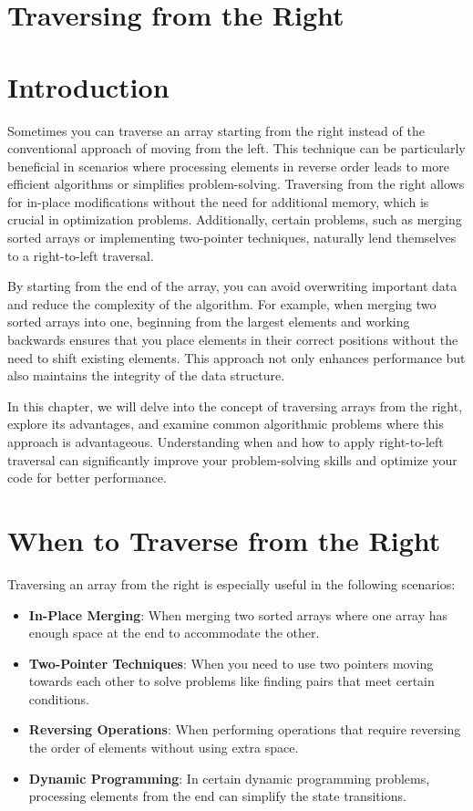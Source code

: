 \section{Traversing from the Right}

\section*{Introduction}

Sometimes you can traverse an array starting from the right instead of the conventional approach of moving from the left. This technique can be particularly beneficial in scenarios where processing elements in reverse order leads to more efficient algorithms or simplifies problem-solving. Traversing from the right allows for in-place modifications without the need for additional memory, which is crucial in optimization problems. Additionally, certain problems, such as merging sorted arrays or implementing two-pointer techniques, naturally lend themselves to a right-to-left traversal.

By starting from the end of the array, you can avoid overwriting important data and reduce the complexity of the algorithm. For example, when merging two sorted arrays into one, beginning from the largest elements and working backwards ensures that you place elements in their correct positions without the need to shift existing elements. This approach not only enhances performance but also maintains the integrity of the data structure.

In this chapter, we will delve into the concept of traversing arrays from the right, explore its advantages, and examine common algorithmic problems where this approach is advantageous. Understanding when and how to apply right-to-left traversal can significantly improve your problem-solving skills and optimize your code for better performance.

\section*{When to Traverse from the Right}

Traversing an array from the right is especially useful in the following scenarios:

\begin{itemize}
    \item \textbf{In-Place Merging}: When merging two sorted arrays where one array has enough space at the end to accommodate the other.
    \item \textbf{Two-Pointer Techniques}: When you need to use two pointers moving towards each other to solve problems like finding pairs that meet certain conditions.
    \item \textbf{Reversing Operations}: When performing operations that require reversing the order of elements without using extra space.
    \item \textbf{Dynamic Programming}: In certain dynamic programming problems, processing elements from the end can simplify the state transitions.
\end{itemize}

